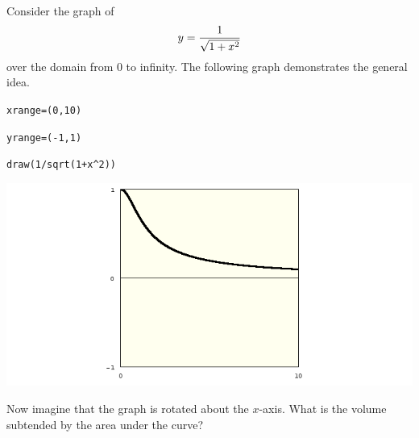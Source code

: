 
\newpage

\subsection{}
Consider the graph of
$$y={1\over\sqrt{1+x^2}}$$
over the domain from 0 to infinity.
The following graph demonstrates the general idea.

\medskip
\verb$xrange=(0,10)$

\verb$yrange=(-1,1)$

\verb$draw(1/sqrt(1+x^2))$

\begin{center}
\includegraphics[scale=0.4]{16.png}
\end{center}

\medskip
\noindent
Now imagine that the graph is rotated about the $x$-axis.
What is the volume subtended by the area under the curve?

